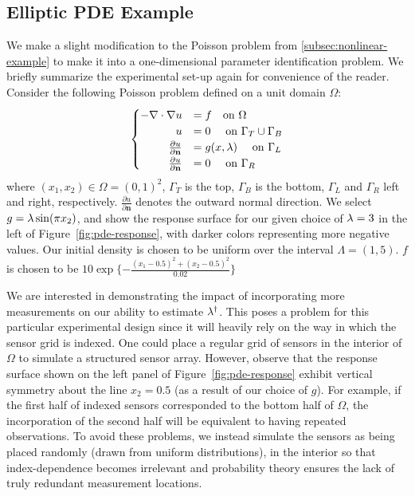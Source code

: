 \subsection{Elliptic PDE Example}\label{sec:pde-example}
We make a slight modification to the Poisson problem from \ref{subsec:nonlinear-example} to make it into a one-dimensional parameter identification problem.
We briefly summarize the experimental set-up again for convenience of the reader.
Consider the following Poisson problem defined on a unit domain $\Omega$:
\begin{equation}\label{eq:pde-equation}
\begin{cases}
\hfill -\nabla \cdot \nabla u &= f \quad\text{on } \Omega \\
\hfill u &= 0 \quad\text{ on } \Gamma_T \cup \Gamma_B \\
\hfill \frac{\partial u}{\partial \mathbf{n}} &= g(x,\param) \quad\text{ on } \Gamma_L \\
\hfill \frac{\partial u}{\partial \mathbf{n}} &= 0 \quad\text{ on } \Gamma_R
\end{cases}
\end{equation}
where $(x_1, x_2) \in \Omega = (0,1)^2$, $\Gamma_T$ is the top, $\Gamma_B$ is the bottom, $\Gamma_L$ and $\Gamma_R$ left and right, respectively.
$\frac{\partial u}{\partial \mathbf{n}}$ denotes the outward normal direction.
We select $g=\lambda \sin(\pi x_2)$, and show the response surface for our given choice of $\lambda = 3$ in the left of Figure~\ref{fig:pde-response}, with darker colors representing more negative values.
Our initial density is chosen to be uniform over the interval $\Lambda = (1,5)$.
$f$ is chosen to be $10\exp\{-\frac{(x_1-0.5)^2 + (x_2 - 0.5)^2}{0.02}\}$


We are interested in demonstrating the impact of incorporating more measurements on our ability to estimate $\lambda^\dagger$.
This poses a problem for this particular experimental design since it will heavily rely on the way in which the sensor grid is indexed.
One could place a regular grid of sensors in the interior of $\Omega$ to simulate a structured sensor array.
However, observe that the response surface shown on the left panel of Figure~\ref{fig:pde-response} exhibit vertical symmetry about the line $x_2=0.5$ (as a result of our choice of $g$).
For example, if the first half of indexed sensors corresponded to the bottom half of $\Omega$, the incorporation of the second half will be equivalent to having repeated observations.
To avoid these problems, we instead simulate the sensors as being placed randomly (drawn from uniform distributions), in the interior so that index-dependence becomes irrelevant and probability theory ensures the lack of truly redundant measurement locations.


